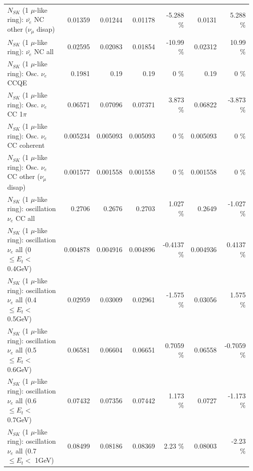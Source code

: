\begin{table}
\begin{tabular}{| l | r | r | r  r | r  r |}
          $N_{SK}$ (1 $\mu$-like ring): $\bar{\nu_e}$ NC other ($\nu_\mu$ disap) &         0.01359 &         0.01244 &         0.01178 &   -5.288 \%  &          0.0131 &    5.288 \%  \\ 
                            $N_{SK}$ (1 $\mu$-like ring): $\bar{\nu_{e}}$ NC all &         0.02595 &         0.02083 &         0.01854 &   -10.99 \%  &         0.02312 &    10.99 \%  \\ 
\hline
\hline
\hline
                                 $N_{SK}$ (1 $\mu$-like ring): Osc. $\nu_e$ CCQE &          0.1981 &            0.19 &            0.19 &        0 \%  &            0.19 &        0 \%  \\ 
                            $N_{SK}$ (1 $\mu$-like ring): Osc. $\nu_e$ CC 1$\pi$ &         0.06571 &         0.07096 &         0.07371 &    3.873 \%  &         0.06822 &   -3.873 \%  \\ 
                          $N_{SK}$ (1 $\mu$-like ring): Osc. $\nu_e$ CC coherent &        0.005234 &        0.005093 &        0.005093 &        0 \%  &        0.005093 &        0 \%  \\ 
           $N_{SK}$ (1 $\mu$-like ring): Osc. $\nu_e$ CC other ($\nu_\mu$ disap) &        0.001577 &        0.001558 &        0.001558 &        0 \%  &        0.001558 &        0 \%  \\ 
                        $N_{SK}$ (1 $\mu$-like ring): oscillation $\nu_e$ CC all &          0.2706 &          0.2676 &          0.2703 &    1.027 \%  &          0.2649 &   -1.027 \%  \\ 
\hline
$N_{SK}$ (1 $\mu$-like ring): oscillation $\nu_{e}$ all (0 $\leq E_{t} <$ 0.4GeV) &        0.004878 &        0.004916 &        0.004896 &  -0.4137 \%  &        0.004936 &   0.4137 \%  \\ 
$N_{SK}$ (1 $\mu$-like ring): oscillation $\nu_{e}$ all (0.4 $\leq E_{t} <$ 0.5GeV) &         0.02959 &         0.03009 &         0.02961 &   -1.575 \%  &         0.03056 &    1.575 \%  \\ 
$N_{SK}$ (1 $\mu$-like ring): oscillation $\nu_{e}$ all (0.5 $\leq E_{t} <$ 0.6GeV) &         0.06581 &         0.06604 &         0.06651 &   0.7059 \%  &         0.06558 &  -0.7059 \%  \\ 
$N_{SK}$ (1 $\mu$-like ring): oscillation $\nu_{e}$ all (0.6 $\leq E_{t} <$ 0.7GeV) &         0.07432 &         0.07356 &         0.07442 &    1.173 \%  &          0.0727 &   -1.173 \%  \\ 
$N_{SK}$ (1 $\mu$-like ring): oscillation $\nu_{e}$ all (0.7 $\leq E_{t} <$ 1GeV) &         0.08499 &         0.08186 &         0.08369 &     2.23 \%  &         0.08003 &    -2.23 \%  \\ 

\end{tabular}
\end{table}
